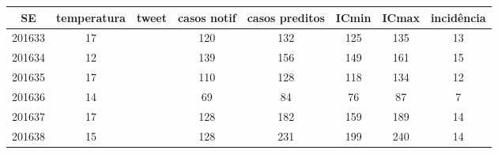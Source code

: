\begin{tabular}{c|ccccccc}
  \hline
SE & temperatura & tweet & casos notif & casos preditos & ICmin & ICmax & incidência \\ 
  \hline
201633 & 17 &  & 120 & 132 & 125 & 135 & 13 \\ 
  201634 & 12 &  & 139 & 156 & 149 & 161 & 15 \\ 
  201635 & 17 &  & 110 & 128 & 118 & 134 & 12 \\ 
  201636 & 14 &  & 69 & 84 & 76 & 87 & 7 \\ 
  201637 & 17 &  & 128 & 182 & 159 & 189 & 14 \\ 
  201638 & 15 &  & 128 & 231 & 199 & 240 & 14 \\ 
   \hline
\end{tabular}
